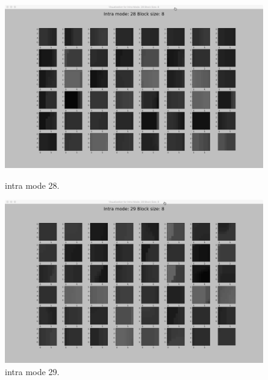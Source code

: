 \begin{figure}[H]

    \vspace*{1cm} %

    \begin{minipage}{0.49\textwidth}
        \includegraphics[width=\linewidth]{Figures/visu-size8x8/8-28}
        \caption[Intra mode 28]{intra mode 28.}
        \label{fig:size8_mode28}
    \end{minipage}
    \hspace{\fill} %
    \begin{minipage}{0.49\textwidth}
        \includegraphics[width=\linewidth]{Figures/visu-size8x8/8-29}
        \caption[Intra mode 29]{intra mode 29.}
        \label{fig:size8_mode29}
    \end{minipage}

    \vspace*{1cm} %


\end{figure}
